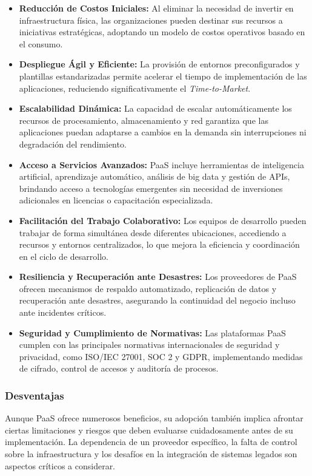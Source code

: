 {                \begin{itemize}
                    \item \textbf{Reducción de Costos Iniciales:} Al eliminar la necesidad de invertir en infraestructura física, las organizaciones pueden destinar sus recursos a iniciativas estratégicas, adoptando un modelo de costos operativos basado en el consumo.
                    \item \textbf{Despliegue Ágil y Eficiente:} La provisión de entornos preconfigurados y plantillas estandarizadas permite acelerar el tiempo de implementación de las aplicaciones, reduciendo significativamente el \textit{Time-to-Market}.
                    \item \textbf{Escalabilidad Dinámica:} La capacidad de escalar automáticamente los recursos de procesamiento, almacenamiento y red garantiza que las aplicaciones puedan adaptarse a cambios en la demanda sin interrupciones ni degradación del rendimiento.
                    \item \textbf{Acceso a Servicios Avanzados:} PaaS incluye herramientas de inteligencia artificial, aprendizaje automático, análisis de big data y gestión de APIs, brindando acceso a tecnologías emergentes sin necesidad de inversiones adicionales en licencias o capacitación especializada.
                    \item \textbf{Facilitación del Trabajo Colaborativo:} Los equipos de desarrollo pueden trabajar de forma simultánea desde diferentes ubicaciones, accediendo a recursos y entornos centralizados, lo que mejora la eficiencia y coordinación en el ciclo de desarrollo.
                    \item \textbf{Resiliencia y Recuperación ante Desastres:} Los proveedores de PaaS ofrecen mecanismos de respaldo automatizado, replicación de datos y recuperación ante desastres, asegurando la continuidad del negocio incluso ante incidentes críticos.
                    \item \textbf{Seguridad y Cumplimiento de Normativas:} Las plataformas PaaS cumplen con las principales normativas internacionales de seguridad y privacidad, como ISO/IEC 27001, SOC 2 y GDPR, implementando medidas de cifrado, control de accesos y auditoría de procesos.
                \end{itemize}
            
            \subsubsection{Desventajas}
                Aunque PaaS ofrece numerosos beneficios, su adopción también implica afrontar ciertas limitaciones y riesgos que deben evaluarse cuidadosamente antes de su implementación. La dependencia de un proveedor específico, la falta de control sobre la infraestructura y los desafíos en la integración de sistemas legados son aspectos críticos a considerar.
                
}
